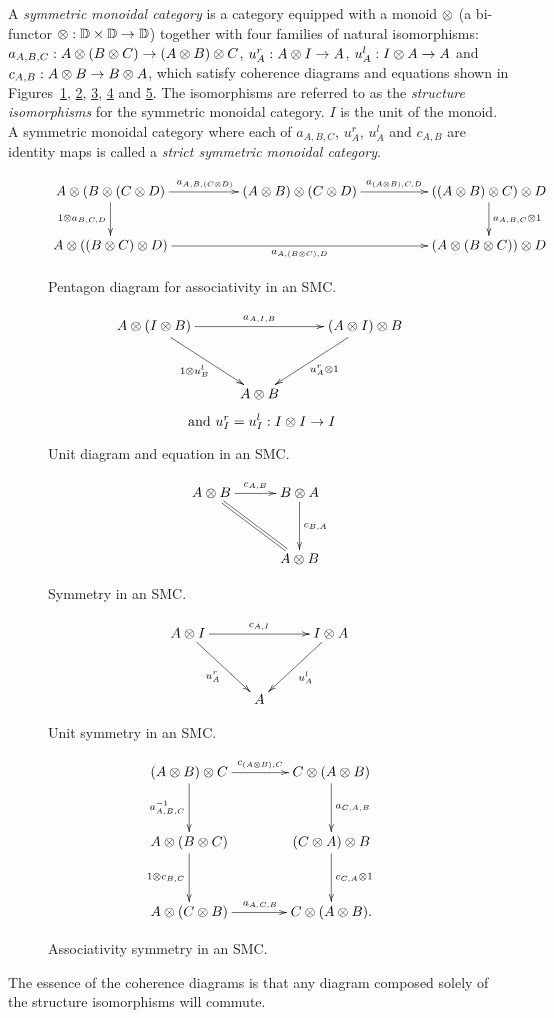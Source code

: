 \begin{definition}\label{symmetricmonoidalcat}
  A \emph{symmetric monoidal category}\cite{barr:ctcs,maclan97:categorieswrkmath} \cD{} is a
  category equipped with a monoid $\otimes$ (a bi-functor $\otimes:\mathbb{D} \times \mathbb{D} \to \mathbb{D}$) together with
  four families of natural isomorphisms:  $a_{A,B,C}:A\otimes(B\otimes C) \to (A\otimes B)\otimes C$, $u^r_{A}:A\otimes I\to A$,
  $u^l_{A}:I\otimes A \to A$ and $c_{A,B}:A\otimes B \to B\otimes A$, which satisfy coherence diagrams and
  equations shown in Figures~\ref{fig:SMC_pentagon}, \ref{fig:SMC_unit}, \ref{fig:SMC_commutes},
  \ref{fig:SMC_unit_symmettry} and \ref{fig:SMC_associativity_symmetry}. The isomorphisms are
  referred to as the \emph{structure isomorphisms}  for the symmetric monoidal category. $I$ is the
  unit of the monoid. A symmetric monoidal category where each of $a_{A,B,C}$, $u^r_{A}$, $u^l_{A}$
  and $c_{A,B}$ are identity maps is called a \emph{strict symmetric monoidal category}.
\end{definition}

\begin{figure}[!htbp]
\[
  \xymatrix@C+25pt{
    A\*(B\*(C\*D) \ar[r]^{a_{A,B,(C\*D)}} \ar[d]_{1\*a_{B,C,D}}
      & (A\*B)\*(C\*D) \ar[r]^{a_{(A\*B),C,D}}
      & ((A\*B)\*C)\*D \ar[d]^{a_{A,B,C}\*1}\\
    A\*((B\*C)\*D) \ar[rr]_{a_{A,(B\*C),D}}
      && (A\*(B\*C))\*D
  }
\]
\caption{Pentagon diagram for associativity in an SMC.}\label{fig:SMC_pentagon}
\end{figure}
\begin{figure}[!htbp]
\[
  \xymatrix@C+5pt@R+10pt{
    A\*(I\*B) \ar[rr]^{a_{A,I,B}} \ar[dr]_{1\*u^l_B}
      && (A\*I)\*B \ar[dl]^{u^r_A \* 1}\\
      &A\*B
  }
\]
\[\text{ and } u^r_I = u^l_I: I\otimes I \to I\]
\caption{Unit diagram and equation in an SMC.}\label{fig:SMC_unit}
\end{figure}
\begin{figure}[!htbp]
\[
  \xymatrix@C+5pt@R+10pt{
    A\*B \ar[r]^{c_{A,B}} \ar@{=}[dr]
      & B\*A \ar[d]^{c_{B,A}}\\
      &A\*B
  }
\]
\caption{Symmetry in an SMC.}\label{fig:SMC_commutes}
\end{figure}
\begin{figure}[!htbp]
\[
  \xymatrix@C+5pt@R+10pt{
    A\*I \ar[rr]^{c_{A,I}} \ar[dr]_{u^r_A}
      && I\*A \ar[dl]^{u^l_A}\\
      &A
  }
\]
\caption{Unit symmetry in an SMC.}\label{fig:SMC_unit_symmettry}
\end{figure}
\begin{figure}[!htbp]
\[
  \xymatrix@C+15pt@R+10pt{
    (A\*B)\*C \ar[r]^{c_{(A\*B),C}} \ar[d]_{a^{-1}_{A,B,C}}
      & C\*(A\*B) \ar[d]^{a_{C,A,B}}\\
    A\*(B\*C) \ar[d]_{1\*c_{B,C}}
      & (C\*A)\*B \ar[d]^{c_{C,A}\*1}\\
    A\*(C\*B) \ar[r]^{a_{A,C,B}}
      & C\*(A\*B).
  }
\]
\caption{Associativity symmetry in an SMC.}\label{fig:SMC_associativity_symmetry}
\end{figure}
The essence of the coherence diagrams is that any diagram composed solely of the structure
isomorphisms will commute.
